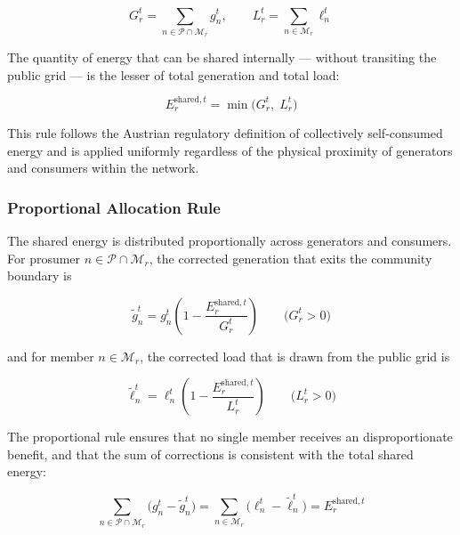 \documentclass[12pt,a4paper]{article}
\begin{document}
\begin{equation}
G_{r}^{t} = \sum_{n \in \mathcal{P} \cap \mathcal{M}_{r}} g_{n}^{t},
\qquad
L_{r}^{t} = \sum_{n \in \mathcal{M}_{r}} \ell_{n}^{t}
\label{eq:rec_totals_infra}
\end{equation}

The quantity of energy that can be shared internally — without transiting the
public grid — is the lesser of total generation and total load:

\begin{equation}
E_{r}^{\mathrm{shared},t} = \min\!\bigl(G_{r}^{t},\; L_{r}^{t}\bigr)
\label{eq:shared_energy_infra}
\end{equation}

This rule follows the Austrian regulatory definition of collectively
self-consumed energy and is applied uniformly regardless of the
physical proximity of generators and consumers within the network.

\subsubsection{Proportional Allocation Rule}

The shared energy is distributed proportionally across generators and
consumers.  For prosumer $n \in \mathcal{P} \cap \mathcal{M}_{r}$, the
corrected generation that exits the community boundary is

\begin{equation}
\tilde{g}_{n}^{t} = g_{n}^{t}\left(1 - \frac{E_{r}^{\mathrm{shared},t}}{G_{r}^{t}}\right)
  \qquad \bigl(G_{r}^{t} > 0\bigr)
\label{eq:gen_correction_infra}
\end{equation}

and for member $n \in \mathcal{M}_{r}$, the corrected load that is drawn
from the public grid is

\begin{equation}
\tilde{\ell}_{n}^{t} = \ell_{n}^{t}\left(1 - \frac{E_{r}^{\mathrm{shared},t}}{L_{r}^{t}}\right)
  \qquad \bigl(L_{r}^{t} > 0\bigr)
\label{eq:load_correction_infra}
\end{equation}

The proportional rule ensures that no single member receives an
disproportionate benefit, and that the sum of corrections is consistent with
the total shared energy:

\begin{equation}
\sum_{n \in \mathcal{P} \cap \mathcal{M}_{r}}
  \bigl(g_{n}^{t} - \tilde{g}_{n}^{t}\bigr)
=
\sum_{n \in \mathcal{M}_{r}}
  \bigl(\ell_{n}^{t} - \tilde{\ell}_{n}^{t}\bigr)
= E_{r}^{\mathrm{shared},t}
\label{eq:rec_conservation}
\end{equation}
\end{document}
